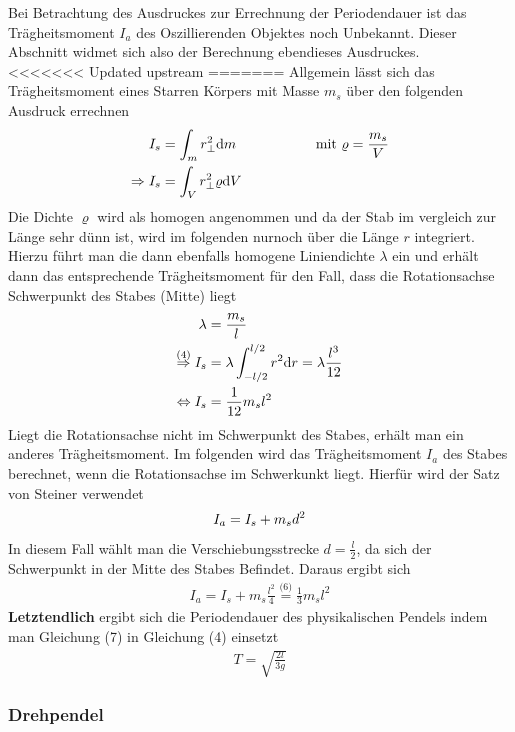 \documentclass[11pt,a4paper]{article}
\begin{document}
Bei Betrachtung des Ausdruckes zur Errechnung der Periodendauer ist das Trägheitsmoment $I_a$ des Oszillierenden Objektes noch Unbekannt. Dieser Abschnitt widmet sich also der Berechnung ebendieses Ausdruckes.\\

<<<<<<< Updated upstream
=======
Allgemein lässt sich das Trägheitsmoment eines Starren Körpers mit Masse $m_s$ über den folgenden Ausdruck errechnen
\begin{align}
	I_s &= \int_{m}^{}  r^2_\perp \mathrm{d}m  \hspace{2cm}\text{mit  }  \varrho = \frac{m_s}{V} \notag\\
	\Rightarrow I_s &= \int_{V}^{} r^2_\perp \varrho \mathrm{d}V 
\end{align}
Die Dichte $\varrho$ wird als homogen angenommen und da der Stab im vergleich zur Länge sehr dünn ist, wird im folgenden nurnoch über die Länge $r$ integriert. Hierzu führt man die dann ebenfalls homogene Liniendichte $\lambda$ ein und erhält dann das entsprechende Trägheitsmoment für den Fall, dass die Rotationsachse Schwerpunkt des Stabes (Mitte) liegt
\begin{align}
	\lambda &= \frac{m_s}{l} \notag \\
	\overset{\text{(4)}}{\underset{\text{ }}{\Rightarrow}} I_s &= \lambda\int_{-l/2}^{l/2} r^2 \mathrm{d}r = \lambda \frac{l^3}{12}\notag \\
	\Leftrightarrow I_s &= \frac{1}{12} m_s l^2 
\end{align}
Liegt die Rotationsachse nicht im Schwerpunkt des Stabes, erhält man ein anderes Trägheitsmoment. Im folgenden wird das Trägheitsmoment $I_a$ des Stabes berechnet, wenn die Rotationsachse im Schwerkunkt liegt. Hierfür wird der Satz von Steiner verwendet
\begin{align}
	I_a = I_s + m_s d^2 \notag
\end{align}
	In diesem Fall wählt man die Verschiebungsstrecke $d=\frac{l}{2}$, da sich der Schwerpunkt in der Mitte des Stabes Befindet. Daraus ergibt sich
\begin{align}
	 I_a = I_s +m_s \frac{l^2}{4}  \overset{\text{(6)}}{=} \frac{1}{3} m_s l^2
\end{align}
{\bf Letztendlich} ergibt sich die Periodendauer des physikalischen Pendels indem man Gleichung (7) in Gleichung (4) einsetzt
\begin{align}
	T = \sqrt{\frac{2l}{3g}} 
\end{align}
       \subsubsection{Drehpendel}
\end{document}
